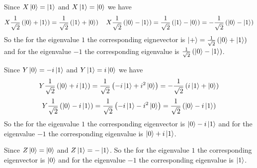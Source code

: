 \documentclass[a4paper, 11pt]{article}
\begin{document}
{Since $X\ket{0}=\ket{1}$ and $X\ket{1}=\ket{0}$ we have 
$$X\frac1{\sqrt{2}}\left(\ket{0}+\ket{1}\right)=\frac1{\sqrt{2}}\left(\ket{1}+\ket{0}\right)\quad X\frac1{\sqrt{2}}\left(\ket{0} -\ket{1}\right)=\frac1{\sqrt{2}}\left(\ket{1}-\ket{0}\right)=-\frac1{\sqrt{2}}\left(\ket{0}-\ket{1}\right)$$So the for the eigenvalue $1$ the corresponding eignevector is $\ket{+}=\frac1{\sqrt{2}}\left(\ket{0}+\ket{1}\right)$ and for the eigenvalue $-1$ the corresponding eigenvalue is $\frac1{\sqrt{2}}\left(\ket{0}-\ket{1}\right)$.

Since $Y\ket{0}=-i\ket{1}$ and $Y\ket{1}=i\ket{0}$ we have 
$$Y\frac1{\sqrt{2}}\left(\ket{0}+i\ket{1}\right)=\frac1{\sqrt{2}}\left(-i\ket{1}+i^2\ket{0}\right) = -\frac1{\sqrt{2}}\left(i\ket{1}+\ket{0}\right)$$ $$ Y\frac1{\sqrt{2}}\left(\ket{0} -i\ket{1}\right)=\frac1{\sqrt{2}}\left(-i\ket{1}-i^2\ket{0}\right)=\frac1{\sqrt{2}}\left(\ket{0}-i\ket{1}\right)$$So the for the eigenvalue $1$ the corresponding eigenvector is $\ket{0} -i\ket{1}$ and for the eigenvalue $-1$ the corresponding eigenvalue is $\ket{0}+i\ket{1}$.

Since $Z\ket{0}=\ket{0}$ and $Z\ket{1}=-\ket{1}$. So the for the eigenvalue $1$ the corresponding eigenvector is $\ket{0}$ and for the eigenvalue $-1$ the corresponding eigenvalue is $\ket{1}$.
}

\end{document}
